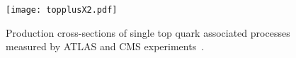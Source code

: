 \begin{figure}[htbp]
    \centering
    \texttt{[image: topplusX2.pdf]}
    \caption[Production 
    cross-sections of single top quark associated processes]{Production 
    cross-sections of single top quark associated processes measured by ATLAS and CMS experiments~\cite{ATL-PHYS-PUB-2024-005}.}%
    \label{fig:topX2_cs}
\end{figure}







